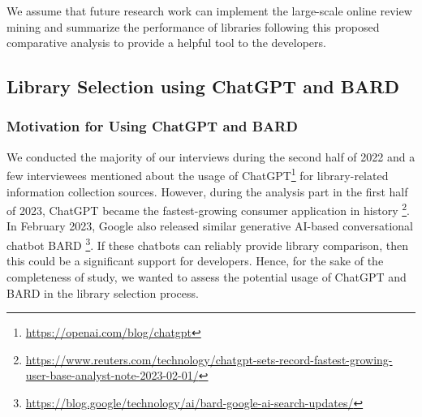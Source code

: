 We assume that future research work can implement the large-scale online review mining and summarize the performance of libraries following this proposed comparative analysis to provide a helpful tool to the developers.

\subsection{Library Selection using ChatGPT and BARD}
\subsubsection{Motivation for Using ChatGPT and BARD}
We conducted the majority of our interviews during the second half of 2022 and a few interviewees mentioned about the usage of ChatGPT\footnote{\url{https://openai.com/blog/chatgpt}} for library-related information collection sources. However, during the analysis part in the first half of 2023, ChatGPT became the fastest-growing consumer application in history \footnote{\url{https://www.reuters.com/technology/chatgpt-sets-record-fastest-growing-user-base-analyst-note-2023-02-01/}}. In February 2023, Google also released similar generative AI-based conversational chatbot BARD \footnote{\url{https://blog.google/technology/ai/bard-google-ai-search-updates/}}. 
If these chatbots can reliably provide library comparison, then this could be a significant support for developers. 
Hence, for the sake of the completeness of study, we wanted to assess the potential usage of ChatGPT and BARD in the library selection process. 

